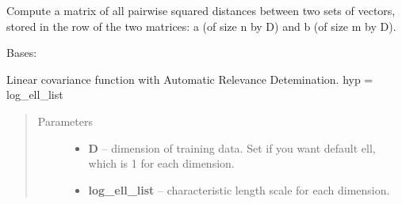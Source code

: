 \documentclass[letterpaper,10pt,english]{sphinxmanual}
\begin{document}
\begin{fulllineitems}
\begin{fulllineitems}
\begin{quote}
\begin{description}
\end{description}\end{quote}

\end{fulllineitems}


\begin{fulllineitems}
\label{pyGPs.Core:pyGPs.Core.cov.Kernel.sq_dist}
Compute a matrix of all pairwise squared distances
between two sets of vectors, stored in the row of the two matrices:
a (of size n by D) and b (of size m by D).

\end{fulllineitems}


\end{fulllineitems}


\begin{fulllineitems}
\label{pyGPs.Core:pyGPs.Core.cov.LINard}
Bases: {\hyperref[pyGPs.Core:pyGPs.Core.cov.Kernel]{}}

Linear covariance function with Automatic Relevance Detemination.
hyp = log\_ell\_list
\begin{quote}\begin{description}
\item[{Parameters}] \leavevmode\begin{itemize}
\item {} 
\textbf{D} -- dimension of training data. Set if you want default ell, which is 1 for each dimension.

\item {} 
\textbf{log\_ell\_list} -- characteristic length scale for each dimension.

\end{itemize}

\end{description}\end{quote}

\begin{fulllineitems}
\label{pyGPs.Core:pyGPs.Core.cov.LINard.getCovMatrix}
\end{fulllineitems}


\begin{fulllineitems}
\label{pyGPs.Core:pyGPs.Core.cov.LINard.getDerMatrix}
\end{fulllineitems}


\end{fulllineitems}
\end{document}
